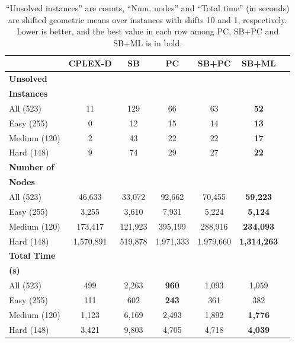 \begin{table}[ht]
\centering
\small
\begin{tabular}{|lcccccc|}
\toprule
 & \textbf{CPLEX-D} & \textbf{SB} & \textbf{PC} & \textbf{SB+PC} & \textbf{SB+ML} \\
\midrule
\textbf{Unsolved} & & & & & \\
\textbf{Instances} & & & & & \\
\quad All (523) & 11 & 129 & 66 & 63 & \textbf{52} \\
\quad Easy (255) & 0 & 12 & 15 & 14 & \textbf{13} \\
\quad Medium (120) & 2 & 43 & 22 & 22 & \textbf{17} \\
\quad Hard (148) & 9 & 74 & 29 & 27 & \textbf{22} \\
\midrule
\textbf{Number of} & & & & & \\
\textbf{Nodes} & & & & & \\
\quad All (523) & 46,633 & 33,072 & 92,662 & 70,455 & \textbf{59,223} \\
\quad Easy (255) & 3,255 & 3,610 & 7,931 & 5,224 & \textbf{5,124} \\
\quad Medium (120) & 173,417 & 121,923 & 395,199 & 288,916 & \textbf{234,093} \\
\quad Hard (148) & 1,570,891 & 519,878 & 1,971,333 & 1,979,660 & \textbf{1,314,263} \\
\midrule
\textbf{Total Time} & & & & & \\
\textbf{(s)} & & & & & \\
\quad All (523) & 499 & 2,263 & \textbf{960} & 1,093 & 1,059 \\
\quad Easy (255) & 111 & 602 & \textbf{243} & 361 & 382 \\
\quad Medium (120) & 1,123 & 6,169 & 2,493 & 1,892 & \textbf{1,776} \\
\quad Hard (148) & 3,421 & 9,803 & 4,705 & 4,718 & \textbf{4,039} \\
\bottomrule
\end{tabular}
\caption{“Unsolved instances” are counts, “Num. nodes” and “Total time” (in seconds) are shifted geometric means over instances with shifts 10 and 1, respectively.
Lower is better, and the best value in each row among PC, SB+PC and SB+ML is in bold.}
    \label{tab:khalil-results}
\end{table}